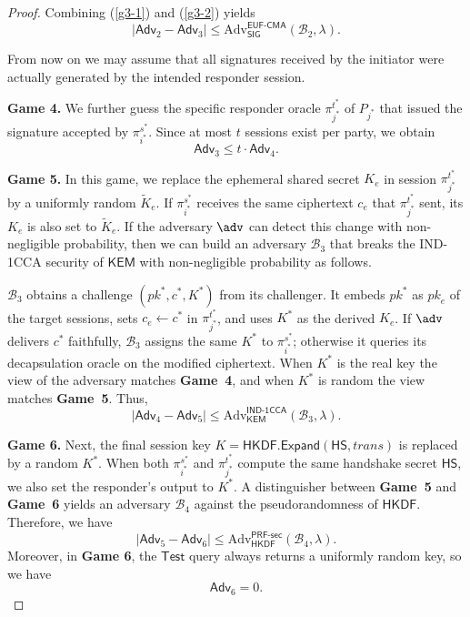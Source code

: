 \documentclass[runningheads]{llncs}
\newcommand{\kem}{\mathsf{KEM}}
\begin{document}
\begin{proof}
Combining (\ref{g3-1}) and (\ref{g3-2}) yields
\begin{equation}
    |\mathsf{Adv}_{2} - \mathsf{Adv}_{3}| \leq \mathrm{Adv}_{\mathsf{SIG}}^{\mathsf{EUF}\text{-}\mathsf{CMA}}(\mathcal{B}_{2}, \lambda).
\end{equation}

From now on we may assume that all signatures received by the initiator were actually generated by the intended responder session.

\smallskip\noindent\textbf{Game 4.}
We further guess the specific responder oracle $\pi_{j^\ast}^{t^\ast}$ of $P_{j^\ast}$ that issued the signature accepted by $\pi_{i^\ast}^{s^\ast}$. Since at most $t$ sessions exist per party, we obtain
\begin{equation}
        \mathsf{Adv}_{3} \leq t \cdot \mathsf{Adv}_{4}.
    \end{equation}

\smallskip\noindent\textbf{Game 5.}
In this game, we replace the ephemeral shared secret $K_{e}$ in session $\pi_{j^\ast}^{t^\ast}$ by a uniformly random $\widetilde{K}_{e}$. If $\pi_{i^\ast}^{s^\ast}$ receives the same ciphertext $c_{e}$ that $\pi_{j^\ast}^{t^\ast}$ sent, its $K_{e}$ is also set to $\widetilde{K}_{e}$.
If the adversary $\adv$ can detect this change with non-negligible probability, then we can build an adversary $\mathcal{B}_{3}$ that breaks the IND-1CCA security of $\kem$ with non-negligible probability as follows.

$\mathcal{B}_{3}$ obtains a challenge $({pk}^*, c^*, K^*)$ from its challenger.
It embeds ${pk}^*$ as ${pk}_{e}$ of the target sessions, sets $c_{e} \gets c^*$ in $\pi_{j^\ast}^{t^\ast}$, and uses $K^*$ as the derived $K_{e}$.
If $\adv$ delivers $c^*$ faithfully, $\mathcal{B}_{3}$ assigns the same $K^*$ to $\pi_{i^\ast}^{s^\ast}$; otherwise it queries its decapsulation oracle on the modified ciphertext. When $K^*$ is the real key the view of the adversary matches \textbf{Game~4}, and when $K^*$ is random the view matches \textbf{Game~5}. Thus,
\begin{equation}
    |\mathsf{Adv}_{4} - \mathsf{Adv}_{5}| \leq \mathrm{Adv}_{\kem}^{\textsf{IND-1CCA}}(\mathcal{B}_{3},\lambda).
\end{equation}

\smallskip\noindent\textbf{Game 6.}
Next, the final session key $K = \mathsf{HKDF.Expand}(\mathsf{HS}, \textit{trans})$ is replaced by a random $K^*$. When both $\pi_{i^\ast}^{s^\ast}$ and $\pi_{j^\ast}^{t^\ast}$ compute the same handshake secret $\mathsf{HS}$, we also set the responder’s output to $K^*$. A distinguisher between \textbf{Game~5} and \textbf{Game~6} yields an adversary $\mathcal{B}_{4}$ against the pseudorandomness of $\mathsf{HKDF}$. Therefore, we have
\begin{equation}
    |\mathsf{Adv}_{5} - \mathsf{Adv}_{6}| \leq \mathrm{Adv}_{\mathsf{HKDF}}^{\mathsf{PRF}\text{-}\mathsf{sec}}(\mathcal{B}_{4},\lambda).
\end{equation}
Moreover, in \textbf{Game 6}, the $\textsf{Test}$ query always returns a uniformly random key, so we have 
\begin{equation}
    \mathsf{Adv}_{6} = 0.
\end{equation}


\end{proof}
\end{document}
